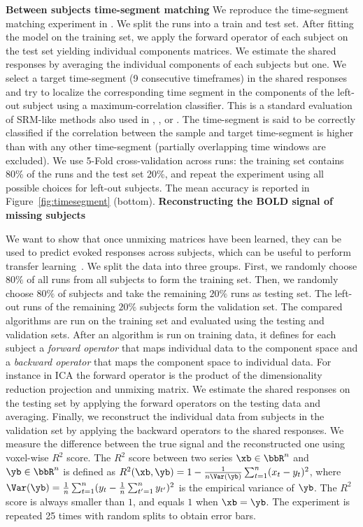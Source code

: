 \textbf{Between subjects time-segment matching} 
\label{timesegment_expe}
We reproduce the time-segment matching experiment in
\cite{chen2015reduced}. 
We split the runs into a train and test set. After fitting the model on the training set, we apply the forward operator of each subject on the test set yielding individual components matrices. We estimate the shared responses by averaging the individual components of each subjects but one.  We select a target time-segment (9 consecutive timeframes) in the shared responses and try to localize the corresponding time segment in the components of the left-out subject using a maximum-correlation classifier.
This is a standard evaluation of SRM-like methods also used in  \cite{chen2015reduced}, \cite{guntupalli2018computational}, \cite{Nastase741975} or
\cite{zhang2016searchlight}.
%
The time-segment is said to be
correctly classified if the correlation between the sample and target
time-segment is higher than with any other time-segment (partially overlapping time windows are excluded).
%
We use 5-Fold cross-validation across runs: the training set contains 80\% of the runs and the test set 20\%, and repeat the experiment using all possible choices for left-out subjects. 
%
The mean accuracy is reported in Figure~\ref{fig:timesegment} (bottom). 
%
\textbf{Reconstructing the BOLD signal of missing subjects}
\label{sec:srm:reconstruction}

We want to show that once unmixing matrices have been learned, they can be
used to predict
evoked responses across subjects, which can be useful to perform transfer learning~\cite{zhang2018transfer}.
%
We split the data into three groups. First, we randomly choose $80\%$ of all runs from all subjects to form the training set.
%
Then, we randomly choose $80\%$ of subjects and take the remaining $20\%$  runs as testing set.
%
The left-out runs  of the remaining $20\%$ subjects form the validation set.
%
The compared algorithms are run on the training set and evaluated using the testing and validation sets.
%
After an algorithm is run on training data, it defines for each subject a \emph{forward operator} that maps individual data to the component space and a \emph{backward operator} that maps the component space to individual data. For instance in ICA the forward operator is the product of the dimensionality reduction projection and unmixing matrix.
%
We estimate the shared responses on the testing set by applying the forward operators on the testing data and averaging. Finally, we reconstruct the individual data from subjects in the validation set by applying the backward operators to the shared responses. We measure the difference between the true signal and the reconstructed one using voxel-wise $R^2$ score. The $R^2$ score between two series $\xb \in \bbR^n$ and $\yb \in \bbR^n$ is defined as
$R^2(\xb, \yb) = 1 - \frac1{n\Var(\yb)}\sum_{t=1}^n (x_t - y_t)^2$, where $\Var(\yb) = \frac1n\sum_{t=1}^n (y_t - \frac1n \sum_{t'=1}^n y_{t'})^2$ is the empirical variance of $\yb$.
%
The $R^2$ score is always smaller than $1$, and equals $1$ when $\xb= \yb$.
The experiment is repeated 25 times with random splits to obtain error bars.


